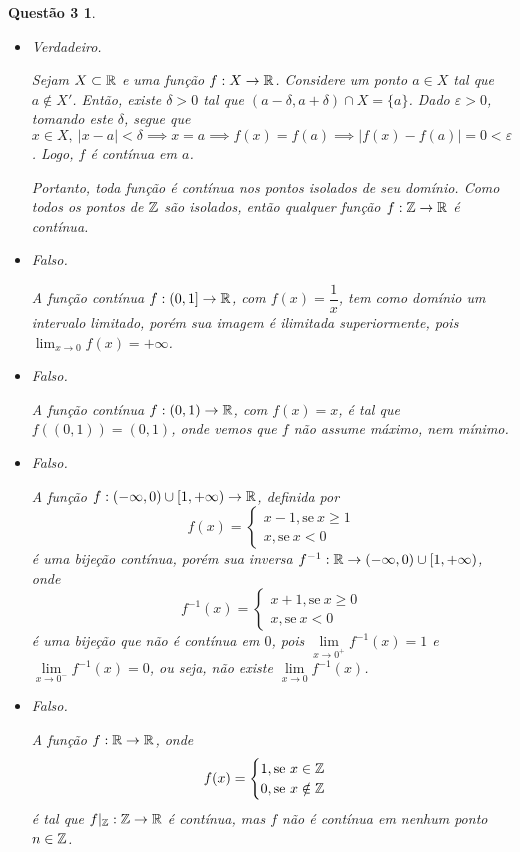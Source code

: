 \documentclass[a4paper,12pt]{article}
\newtheorem*{3}{Questão 3}
\begin{document}
\begin{3}

	\begin{itemize}
		
		\item Verdadeiro. 
		
		Sejam $X \subset \Bbb R$ e uma função $f:X \to \Bbb R$. Considere um ponto $a \in X$ tal que $a \notin X'$. Então, existe $\delta > 0$ tal que $(a - \delta, a + \delta) \cap X = \{a\}$. Dado $\varepsilon > 0$, tomando este $\delta$, segue que $x \in X, \ |x-a| < \delta \implies x = a \implies f(x) = f(a) \implies |f(x) - f(a)| = 0 < \varepsilon$. Logo, $f$ é contínua em $a$.
		
		Portanto, toda função é contínua nos pontos isolados de seu domínio. Como todos os pontos de $\Bbb Z$ são isolados, então qualquer função $f: \Bbb Z \to \Bbb R$ é contínua.
		
		\item Falso.
		
		A função contínua $f:(0,1] \to \Bbb R$, com $f(x) = \dfrac{1}{x}$, tem como domínio um intervalo limitado, porém sua imagem é ilimitada superiormente, pois $\lim_{x\to0}f(x) = +\infty$.
		
		\item Falso.
		
		A função contínua $f:(0,1) \to \Bbb R$, com $f(x) = x$, é tal que $f((0,1)) = (0,1)$, onde vemos que $f$ não assume máximo, nem mínimo.
		
		\item Falso.
		
		A função $f:(-\infty,0)\cup[1,+\infty) \to \Bbb R$, definida por $$f(x) = 
		\begin{cases}
		x-1, \text{se} \ x \geq 1 \\
		x, \text{se} \ x < 0
		\end{cases}$$
		é uma bijeção contínua, porém sua inversa $f^{-1}: \Bbb R \to (-\infty,0)\cup[1,+\infty)$, onde $$f^{-1}(x) = 
		\begin{cases}
		x+1, \text{se} \ x \geq 0 \\
		x, \text{se} \ x < 0
		\end{cases}$$
		é uma bijeção que não é contínua em $0$, pois $\lim\limits_{x\to0^+}f^{-1}(x) = 1$ e $\lim\limits_{x\to0^-}f^{-1}(x) = 0$, ou seja, não existe $\lim\limits_{x\to0}f^{-1}(x)$.
		
		\item Falso.
		
		A função $f: \Bbb R \to \Bbb R$, onde $$f(x) = \begin{cases}
		1, \text{se} \ x \in \Bbb Z \\
		0, \text{se} \ x \notin \Bbb Z
		\end{cases}$$
		é tal que $f|_{\Bbb Z} : \Bbb Z \to \Bbb R$ é contínua, mas $f$ não é contínua em nenhum ponto $n \in \Bbb Z$. 
		

\end{itemize}
\end{3}
\end{document}
